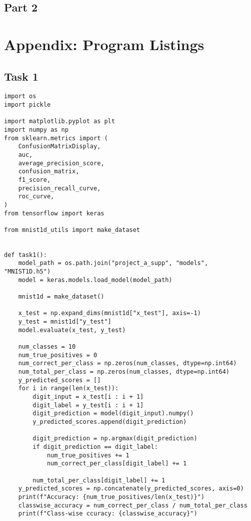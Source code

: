 \documentclass{article}
\begin{document}
\subsection{Part 2}


\clearpage
\appendix
\section{Appendix: Program Listings}

\subsection{Task 1}
\label{sec:task1-listing}

\begin{lstlisting}
import os
import pickle

import matplotlib.pyplot as plt
import numpy as np
from sklearn.metrics import (
    ConfusionMatrixDisplay,
    auc,
    average_precision_score,
    confusion_matrix,
    f1_score,
    precision_recall_curve,
    roc_curve,
)
from tensorflow import keras

from mnist1d_utils import make_dataset


def task1():
    model_path = os.path.join("project_a_supp", "models", "MNIST1D.h5")
    model = keras.models.load_model(model_path)

    mnist1d = make_dataset()

    x_test = np.expand_dims(mnist1d["x_test"], axis=-1)
    y_test = mnist1d["y_test"]
    model.evaluate(x_test, y_test)

    num_classes = 10
    num_true_positives = 0
    num_correct_per_class = np.zeros(num_classes, dtype=np.int64)
    num_total_per_class = np.zeros(num_classes, dtype=np.int64)
    y_predicted_scores = []
    for i in range(len(x_test)):
        digit_input = x_test[i : i + 1]
        digit_label = y_test[i : i + 1]
        digit_prediction = model(digit_input).numpy()
        y_predicted_scores.append(digit_prediction)

        digit_prediction = np.argmax(digit_prediction)
        if digit_prediction == digit_label:
            num_true_positives += 1
            num_correct_per_class[digit_label] += 1

        num_total_per_class[digit_label] += 1
    y_predicted_scores = np.concatenate(y_predicted_scores, axis=0)
    print(f"Accuracy: {num_true_positives/len(x_test)}")
    classwise_accuracy = num_correct_per_class / num_total_per_class
    print(f"Class-wise ccuracy: {classwise_accuracy}")


\end{lstlisting}
\end{document}
